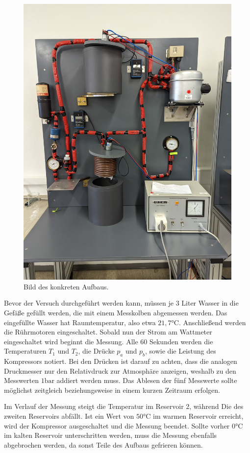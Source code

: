 \begin{figure}
    \centering
    \caption{Bild des konkreten Aufbaus.}
    \label{fig:Aufbau_real}
    \includegraphics[width=.4\textwidth]{content/Gesamtbild.jpg}
\end{figure}

Bevor der Versuch durchgeführt werden kann, müssen je 3 Liter Wasser in die Gefäße gefüllt werden, die mit einem Messkolben abgemessen werden.
Das eingefüllte Wasser hat Raumtemperatur, also etwa $21,7 \unit{\degreeCelsius}$.
Anschließend werden die Rührmotoren eingeschaltet. Sobald nun der Strom am Wattmeter eingeschaltet wird beginnt die Messung. Alle 60 Sekunden werden
die Temperaturen $T_1$ und $T_2$, die Drücke $p_a$ und $p_b$, sowie die Leistung des Kompressors notiert. Bei den Drücken ist darauf zu achten, dass die analogen Druckmesser
nur den Relativdruck zur Atmosphäre anzeigen, weshalb zu den Messwerten $1 \unit{\bar}$ addiert werden muss. Das Ablesen der fünf Messwerte sollte möglichst zeitgleich beziehungsweise
in einem kurzen Zeitraum erfolgen.

Im Verlauf der Messung steigt die Temperatur im Reservoir 2, während Die des zweiten Reservoirs abfällt. Ist ein Wert von $50 \unit{\degreeCelsius}$
im warmen Reservoir erreicht, wird der Kompressor ausgeschaltet und die Messung beendet. Sollte vorher $0 \unit{\degreeCelsius}$ im kalten Reservoir unterschritten werden, muss die
Messung ebenfalls abgebrochen werden, da sonst Teile des Aufbaus gefrieren können.